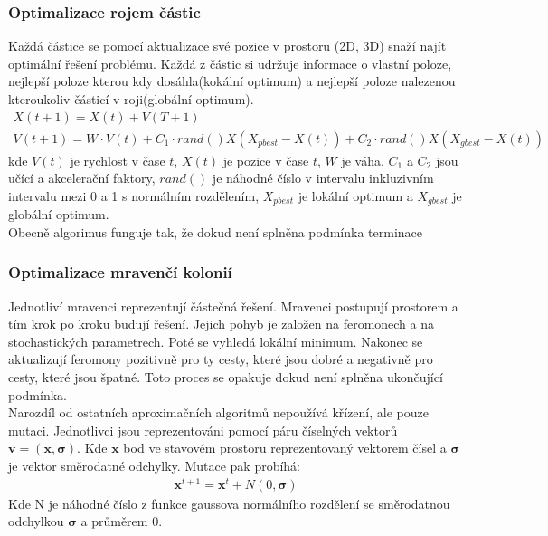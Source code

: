 \subsubsection{Optimalizace rojem částic}
Každá částice se pomocí aktualizace své pozice v prostoru (2D, 3D) snaží najít optimální řešení problému. Každá z částic si udržuje informace o vlastní poloze, nejlepší poloze
kterou kdy dosáhla(kokální optimum) a nejlepší poloze nalezenou kteroukoliv částicí v roji(globální optimum). 
\begin{gather*}
    X(t+1) = X(t) + V(T+1)\\
    V(t+1) = W\cdot V(t) + C_1\cdot rand()X(X_{pbest}-X(t)) + C_2\cdot rand()X(X_{gbest}-X(t))
\end{gather*}
kde \(V(t)\) je rychlost v čase \(t\), \(X(t)\) je pozice v čase \(t\), \(W\) je váha, \(C_1\) a \(C_2\) jsou učící a akcelerační faktory, \(rand()\) je náhodné
číslo v intervalu inkluzivním intervalu mezi 0 a 1 s normálním rozdělením, \(X_ {pbest}\) je lokální optimum a \(X_{gbest}\) je globální optimum. \\
Obecně algorimus funguje tak, že dokud není splněna podmínka terminace 

\subsubsection{Optimalizace mravenčí kolonií}
Jednotliví mravenci reprezentují částečná řešení. Mravenci postupují prostorem a tím krok po kroku budují řešení. Jejich pohyb je založen na feromonech a na 
stochastických parametrech. Poté se vyhledá lokální minimum. Nakonec se aktualizují feromony pozitivně pro ty cesty, které jsou dobré a negativně pro cesty, které
jsou špatné. Toto proces se opakuje dokud není splněna ukončující podmínka.\\
Narozdíl od ostatních aproximačních algoritmů nepoužívá křízení, ale pouze mutaci. Jednotlivci jsou reprezentováni pomocí páru číselných vektorů \(\mathbf{v} =
(\mathbf{x},\boldsymbol{\sigma})\). Kde \(\mathbf{x}\) bod ve stavovém prostoru reprezentovaný vektorem čísel a \(\boldsymbol{\sigma}\) je vektor směrodatné 
odchylky. Mutace pak probíhá:\\
\begin{gather*}
    \mathbf{x}^{t+1} = \mathbf{x}^t + N(0, \boldsymbol{\sigma})
\end{gather*}
Kde N je náhodné číslo z funkce gaussova normálního rozdělení se směrodatnou odchylkou \(\boldsymbol{\sigma}\) a průměrem 0.